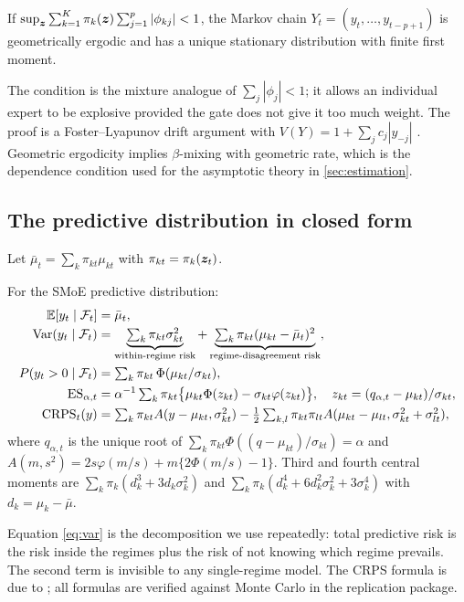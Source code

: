 \begin{proposition}\label{prop:ergodic}
If $\sup_{\bm{z}}\sum_{k=1}^K\pi_k(\bm{z})\sum_{j=1}^p|\phi_{kj}|<1$, the Markov chain
$Y_t=(y_t,\dots,y_{t-p+1})$ is geometrically ergodic and has a unique stationary distribution with
finite first moment.
\end{proposition}

\noindent The condition is the mixture analogue of $\sum_j|\phi_j|<1$; it allows an individual expert
to be explosive provided the gate does not give it too much weight. The proof is a Foster--Lyapunov
drift argument with $V(Y)=1+\sum_j c_j|y_{-j}|$ \citep{meyn2009markov}. Geometric ergodicity
implies $\beta$-mixing with geometric rate, which is the dependence condition used for the
asymptotic theory in \cref{sec:estimation}.

\subsection{The predictive distribution in closed form}

Let $\bar\mu_t=\sum_k\pi_{kt}\mu_{kt}$ with $\pi_{kt}=\pi_k(\bm{z}_t)$.

\begin{proposition}\label{prop:closed}
For the SMoE predictive distribution:
\begin{align}
  \mathbb{E}[y_t\mid\mathcal{F}_t]&=\bar\mu_t, \label{eq:mean}\\
  \operatorname{Var}(y_t\mid\mathcal{F}_t)&=\underbrace{\textstyle\sum_k\pi_{kt}\sigma_{kt}^2}_{\text{within-regime risk}}
     +\underbrace{\textstyle\sum_k\pi_{kt}(\mu_{kt}-\bar\mu_t)^2}_{\text{regime-disagreement risk}},\label{eq:var}\\
  P(y_t>0\mid\mathcal{F}_t)&=\textstyle\sum_k\pi_{kt}\,\Phi(\mu_{kt}/\sigma_{kt}),\label{eq:pup}\\
  \mathrm{ES}_{\alpha,t}&=\alpha^{-1}\textstyle\sum_k\pi_{kt}\big\{\mu_{kt}\Phi(z_{kt})-\sigma_{kt}\varphi(z_{kt})\big\},
  \quad z_{kt}=(q_{\alpha,t}-\mu_{kt})/\sigma_{kt},\label{eq:es}\\
  \mathrm{CRPS}_t(y)&=\textstyle\sum_k\pi_{kt}A(y-\mu_{kt},\sigma^2_{kt})
     -\tfrac12\sum_{k,l}\pi_{kt}\pi_{lt}A(\mu_{kt}-\mu_{lt},\sigma^2_{kt}+\sigma^2_{lt}),\label{eq:crps}
\end{align}
where $q_{\alpha,t}$ is the unique root of $\sum_k\pi_{kt}\Phi((q-\mu_{kt})/\sigma_{kt})=\alpha$ and
$A(m,s^2)=2s\varphi(m/s)+m\{2\Phi(m/s)-1\}$. Third and fourth central moments are
$\sum_k\pi_k(d_k^3+3d_k\sigma_k^2)$ and $\sum_k\pi_k(d_k^4+6d_k^2\sigma_k^2+3\sigma_k^4)$ with
$d_k=\mu_k-\bar\mu$.
\end{proposition}

\noindent Equation \eqref{eq:var} is the decomposition we use repeatedly: total predictive risk is
the risk inside the regimes plus the risk of not knowing which regime prevails. The second term is
invisible to any single-regime model. The CRPS formula is due to \citet{grimit2006continuous}; all
formulas are verified against Monte Carlo in the replication package.
